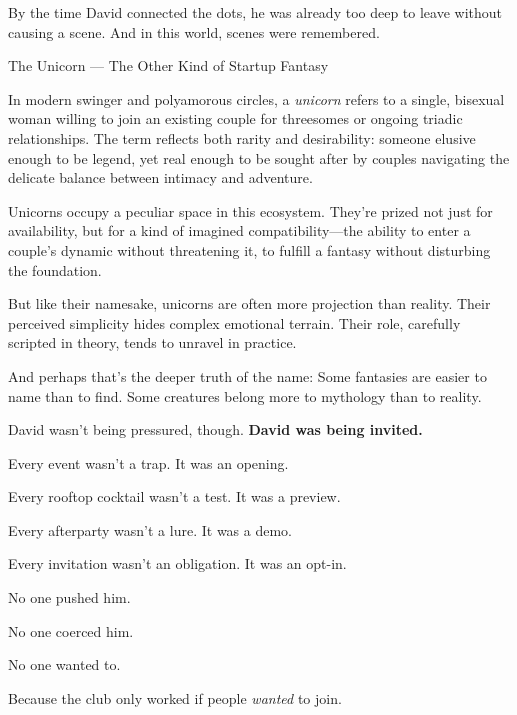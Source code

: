 By the time David connected the dots, he was already too deep to leave without causing a scene.  
And in this world, scenes were remembered.

\medskip

\begin{HistoricalSidebar}{The Unicorn --- The Other Kind of Startup Fantasy}

  In modern swinger and polyamorous circles, a \textit{unicorn} refers to a single, bisexual woman willing to join an existing 
  couple for threesomes or ongoing triadic relationships. The term reflects both rarity and desirability: someone elusive enough 
  to be legend, yet real enough to be sought after by couples navigating the delicate balance between intimacy and adventure.

  \medskip
  
  Unicorns occupy a peculiar space in this ecosystem. They’re prized not just for availability, but for a kind of imagined 
  compatibility—the ability to enter a couple’s dynamic without threatening it, to fulfill a fantasy without disturbing the 
  foundation.

  \medskip
  
  But like their namesake, unicorns are often more projection than reality. Their perceived simplicity hides complex emotional 
  terrain. Their role, carefully scripted in theory, tends to unravel in practice.

  \medskip
  
  And perhaps that’s the deeper truth of the name:  
  Some fantasies are easier to name than to find.  
  Some creatures belong more to mythology than to reality.
  
\end{HistoricalSidebar}

\medskip

David wasn't being pressured, though.  \textbf{David was being invited.}

Every event wasn’t a trap. It was an opening.

Every rooftop cocktail wasn’t a test. It was a preview.  

Every afterparty wasn’t a lure. It was a demo.  

Every invitation wasn’t an obligation. It was an opt-in.

No one pushed him. 

No one coerced him. 

No one wanted to. 

Because the club only worked if people \textit{wanted} to join.

